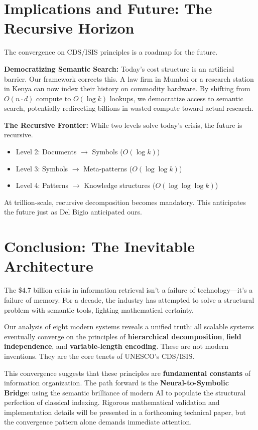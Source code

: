 \documentclass[manuscript,screen,nonacm]{acmart}
\begin{document}
\section{Implications and Future: The Recursive Horizon}

The convergence on CDS/ISIS principles is a roadmap for the future.

\textbf{Democratizing Semantic Search:}
Today's cost structure is an artificial barrier. Our framework corrects this. A law firm in Mumbai or a research station in Kenya can now index their history on commodity hardware. By shifting from $O(n \cdot d)$ compute to $O(\log k)$ lookups, we democratize access to semantic search, potentially redirecting billions in wasted compute toward actual research.

\textbf{The Recursive Frontier:}
While two levels solve today's crisis, the future is recursive.
\begin{itemize}
    \item Level 2: Documents $\rightarrow$ Symbols ($O(\log k)$)
    \item Level 3: Symbols $\rightarrow$ Meta-patterns ($O(\log \log k)$)
    \item Level 4: Patterns $\rightarrow$ Knowledge structures ($O(\log \log \log k)$)
\end{itemize}
At trillion-scale, recursive decomposition becomes mandatory. This anticipates the future just as Del Bigio anticipated ours.

\section{Conclusion: The Inevitable Architecture}

The \$4.7 billion crisis in information retrieval isn't a failure of technology---it's a failure of memory. For a decade, the industry has attempted to solve a structural problem with semantic tools, fighting mathematical certainty.

Our analysis of eight modern systems reveals a unified truth: all scalable systems eventually converge on the principles of \textbf{hierarchical decomposition}, \textbf{field independence}, and \textbf{variable-length encoding}. These are not modern inventions. They are the core tenets of UNESCO's CDS/ISIS.

This convergence suggests that these principles are \textbf{fundamental constants} of information organization. The path forward is the \textbf{Neural-to-Symbolic Bridge}: using the semantic brilliance of modern AI to populate the structural perfection of classical indexing. Rigorous mathematical validation and implementation details will be presented in a forthcoming technical paper, but the convergence pattern alone demands immediate attention.
\end{document}
